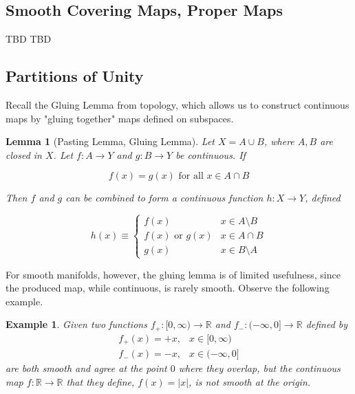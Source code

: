 \documentclass{article}
\newtheorem{lemma}[theorem]{Lemma}
\newtheorem{example}{Example}[section]
\theoremstyle{remark}
\theoremstyle{definition}
\begin{document}
  \subsection{Smooth Covering Maps, Proper Maps}

    TBD
    TBD

  \subsection{Partitions of Unity}

    Recall the Gluing Lemma from topology, which allows us to construct continuous maps by "gluing together" maps defined on subspaces. 

    \begin{lemma}[Pasting Lemma, Gluing Lemma]
      Let $X = A \cup B$, where $A, B$ are closed in $X$. Let $f: A \longrightarrow Y$ and $g: B \longrightarrow Y$ be continuous. If 

        \[f(x) = g(x) \text{ for all } x \in A \cap B\]

      Then $f$ and $g$ can be combined to form a continuous function $h: X \longrightarrow Y$, defined

        \[h(x) \equiv \begin{cases}
            f(x) & x \in A \setminus B \\
            f(x) \text{ or } g(x) & x \in A \cap B \\
            g(x) & x \in B \setminus A
        \end{cases}\]
    \end{lemma}

    For smooth manifolds, however, the gluing lemma is of limited usefulness, since the produced map, while continuous, is rarely smooth. Observe the following example. 

    \begin{example}
      Given two functions $f_+: [0, \infty) \longrightarrow \mathbb{R}$ and $f_-: (-\infty, 0] \longrightarrow \mathbb{R}$ defined by 
      \begin{align*}
        f_+(x) = + x, & x \in [0, \infty) \\
        f_-(x) = - x, & x \in (-\infty, 0]
      \end{align*}
      are both smooth and agree at the point $0$ where they overlap, but the continuous map $f: \mathbb{R} \longrightarrow \mathbb{R}$ that they define, $f(x) = |x|$, is not smooth at the origin. 
    \end{example}
\end{document}
